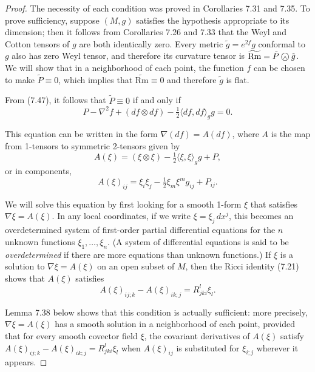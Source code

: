 \begin{proof}
The necessity of each condition was proved in Corollaries 7.31 and 7.35. To prove sufficiency, suppose $(M,g)$ satisfies the hypothesis appropriate to its dimension; then it follows from Corollaries 7.26 and 7.33 that the Weyl and Cotton tensors of $g$ are both identically zero. Every metric $\tilde{g} = e^{2f} g$ conformal to $g$ also has zero Weyl tensor, and therefore its curvature tensor is $\widetilde{\mathrm{Rm}} = \tilde{P} \owedge \tilde{g}$. We will show that in a neighborhood of each point, the function $f$ can be chosen to make $\tilde{P} \equiv 0$, which implies that $\widetilde{\mathrm{Rm}} \equiv 0$ and therefore $\tilde{g}$ is flat.

From (7.47), it follows that $\tilde{P} \equiv 0$ if and only if
\begin{equation}
P - \nabla^2 f + (df \otimes df) - \tfrac{1}{2}\langle df, df\rangle_g g = 0. \tag{7.52}
\end{equation}

This equation can be written in the form $\nabla(df) = A(df)$, where $A$ is the map from 1-tensors to symmetric 2-tensors given by
\[
A(\xi) = (\xi \otimes \xi) - \tfrac{1}{2}\langle \xi, \xi \rangle_g g + P,
\]
or in components,
\begin{equation}
A(\xi)_{ij} = \xi_i \xi_j - \tfrac{1}{2}\xi_m \xi^m g_{ij} + P_{ij}. \tag{7.53}
\end{equation}

We will solve this equation by first looking for a smooth 1-form $\xi$ that satisfies $\nabla \xi = A(\xi)$. In any local coordinates, if we write $\xi = \xi_j \, dx^j$, this becomes an overdetermined system of first-order partial differential equations for the $n$ unknown functions $\xi_1, \ldots, \xi_n$. (A system of differential equations is said to be \emph{overdetermined} if there are more equations than unknown functions.) If $\xi$ is a solution to $\nabla \xi = A(\xi)$ on an open subset of $M$, then the Ricci identity (7.21) shows that $A(\xi)$ satisfies
\begin{equation}
A(\xi)_{ij;k} - A(\xi)_{ik;j} = R_{jki}^l \xi_l. \tag{7.54}
\end{equation}

Lemma 7.38 below shows that this condition is actually sufficient: more precisely, $\nabla \xi = A(\xi)$ has a smooth solution in a neighborhood of each point, provided that for every smooth covector field $\xi$, the covariant derivatives of $A(\xi)$ satisfy $A(\xi)_{ij;k} - A(\xi)_{ik;j} = R_{jki}^l \xi_l$ when $A(\xi)_{ij}$ is substituted for $\xi_{i;j}$ wherever it appears.


\end{proof}
